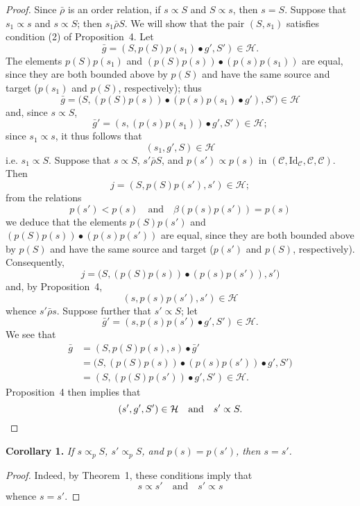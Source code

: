 \documentclass[fleqn]{article}
\newenvironment{itenv}[1]
  {\phantomsection\par\medskip\noindent\textbf{#1.}\itshape}
  {\par\medskip}
\newcommand{\oldpage}[1]{\marginpar{\footnotesize$\Big\vert$ \textit{p.~#1}}}
\newcommand{\CC}{\mathcal{C}}
\newcommand{\HH}{\mathcal{H}}
\newcommand{\relrhobar}{\mathrel{\bar{\rho}}}
\newcommand{\subs}{\mathrel{\propto}}
\newcommand{\Id}{\mathrm{Id}}
\begin{document}
\begin{proof}
  Since $\relrhobar$ is an order relation, if $s\subs S$ and $S\subs s$, then $s=S$.
  Suppose that $s_1\subs s$ and $s\subs S$;
  then $s_1\relrhobar S$.
  We will show that the pair $(S,s_1)$ satisfies condition (2\textquotesingle) of Proposition~4.
  Let
  \[
    \bar{g}
    = (S,p(S)p(s_1)\bullet g',S')
    \in\HH.
  \]
  The elements $p(S)p(s_1)$ and $(p(S)p(s))\bullet(p(s)p(s_1))$ are equal, since they are both bounded above by $p(S)$ and have the same source and target ($p(s_1)$ and $p(S)$, respectively);
  thus
  \[
    \bar{g}
    = \big(S,(p(S)p(s))\bullet(p(s)p(s_1)\bullet g'),S'\big)
    \in\HH
  \]
  and, since $s\subs S$,
  \[
    \bar{g}'
    = (s,(p(s)p(s_1))\bullet g', S')
    \in\HH;
  \]
  since $s_1\subs s$, it thus follows that
  \[
    (s_1,g',S)
    \in\HH
  \]
  i.e. $s_1\subs S$.
  Suppose that $s\subs S$, $s'\relrhobar S$, and $p(s')\subs p(s)$ in $(\CC,\Id_\CC,\CC,\CC)$.
  Then
  \[
    j
    = (S,p(S)p(s'),s')
    \in\HH;
  \]
  from the relations
  \[
    p(s') < p(s)
    \quad\text{and}\quad
    \beta(p(s)p(s')) = p(s)
  \]
  we deduce that the elements $p(S)p(s')$ and $(p(S)p(s))\bullet(p(s)p(s'))$ are equal, since they are both bounded above by $p(S)$ and have the same source and target ($p(s')$ and $p(S)$, respectively).
  Consequently,
  \[
    j
    = \big(S,(p(S)p(s))\bullet(p(s)p(s')),s'\big)
  \]
  and, by Proposition~4,
  \[
    (s,p(s)p(s'),s')
    \in\HH
  \]
  whence $s'\relrhobar s$.
  Suppose further that $s'\subs S$;
  let
  \[
    \bar{g}'
    = (s,p(s)p(s')\bullet g',S')
    \in\HH.
  \]
  We see that
  \[
    \begin{aligned}
      \bar{g}
      &= (S,p(S)p(s),s)\bullet\bar{g}'
    \\&= \big(S,(p(S)p(s))\bullet(p(s)p(s'))\bullet g',S'\big)
    \\&= (S,(p(S)p(s'))\bullet g',S')
    \in\HH.
    \end{aligned}
  \]
  \oldpage{363}
  Proposition~4 then implies that
  \[
    (s',g',S')\in\HH
    \quad\text{and}\quad
    s'\subs S.
    \qedhere
  \]
\end{proof}

\begin{itenv}{Corollary 1}
  If $s\subs_p S$, $s'\subs_p S$, and $p(s)=p(s')$, then $s=s'$.
\end{itenv}

\begin{proof}
  Indeed, by Theorem~1, these conditions imply that
  \[
    s\subs s'
    \quad\text{and}\quad
    s'\subs s
  \]
  whence $s=s'$.
\end{proof}
\end{document}
